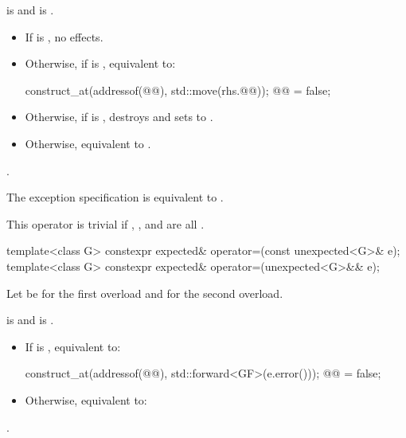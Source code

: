 \begin{itemdescr}
\pnum
\constraints
{} is  and
 is .

\pnum
\effects
\begin{itemize}
\item
If  is , no effects.
\item
Otherwise, if  is , equivalent to:
\begin{codeblock}
construct_at(addressof(@@), std::move(rhs.@@));
@@ = false;
\end{codeblock}
\item
Otherwise, if  is ,
destroys  and sets  to .
\item
Otherwise, equivalent to .
\end{itemize}

\pnum
\returns
{}.

\pnum
\remarks
The exception specification is equivalent to
.

\pnum
This operator is trivial if
,
, and
are all .
\end{itemdescr}

%
\begin{itemdecl}
template<class G>
  constexpr expected& operator=(const unexpected<G>& e);
template<class G>
  constexpr expected& operator=(unexpected<G>&& e);
\end{itemdecl}

\begin{itemdescr}
\pnum
Let  be  for the first overload and
 for the second overload.

\pnum
\constraints
{} is  and
 is .

\pnum
\effects
\begin{itemize}
\item
If  is , equivalent to:
\begin{codeblock}
construct_at(addressof(@@), std::forward<GF>(e.error()));
@@ = false;
\end{codeblock}
\item
Otherwise, equivalent to:
\end{itemize}

\pnum
\returns
{}.
\end{itemdescr}

